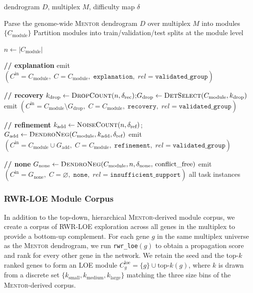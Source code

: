 \documentclass[thesis,letterpaper,12pt]{utthesis}
\begin{document}
\begin{algorithm}[t]
\caption{Creation of the \textsc{Mentor}-derived module training corpus}
\label{alg:mentor-module-corpus}
\begin{algorithmic}[1]
\Require dendrogram $D$, multiplex $M$, difficulty map $\delta$

\State Parse the genome-wide \textsc{Mentor} dendrogram $D$ over multiplex $M$ into modules $\{C_{\text{module}}\}$
\State Partition modules into train/validation/test splits at the module level

    \State $n \gets |C_{\text{module}}|$

    \State \textbf{// explanation}
    \State emit $(C^{\text{in}} = C_{\text{module}},\; C = C_{\text{module}},\; \texttt{explanation},\; rel=\texttt{validated\_group})$

    \State \textbf{// recovery}
    \State $k_{\text{drop}} \gets \textsc{DropCount}(n, \delta_{\text{rec}})$;\quad $G_{\text{drop}} \gets \textsc{DetSelect}(C_{\text{module}}, k_{\text{drop}})$
    \State emit $(C^{\text{in}} = C_{\text{module}} \setminus G_{\text{drop}},\; C = C_{\text{module}},\; \texttt{recovery},\; rel=\texttt{validated\_group})$

    \State \textbf{// refinement}
    \State $k_{\text{add}} \gets \textsc{NoiseCount}(n, \delta_{\text{ref}})$;\quad $G_{\text{add}} \gets \textsc{DendroNeg}(C_{\text{module}}, k_{\text{add}}, \delta_{\text{ref}})$
    \State emit $(C^{\text{in}} = C_{\text{module}} \cup G_{\text{add}},\; C = C_{\text{module}},\; \texttt{refinement},\; rel=\texttt{validated\_group})$

    \State \textbf{// none}
    \State $G_{\text{none}} \gets \textsc{DendroNeg}(C_{\text{module}}, n, \delta_{\text{none}},\, \text{conflict\_free})$
    \State emit $(C^{\text{in}} = G_{\text{none}},\; C = \varnothing,\; \texttt{none},\; rel=\texttt{insufficient\_support})$
\EndFor
\State \Return all task instances
\end{algorithmic}
\end{algorithm}

\subsubsection{RWR-LOE Module Corpus}
In addition to the top-down, hierarchical \textsc{Mentor}-derived module corpus, we create a corpus of RWR-LOE exploration across all genes in the multiplex to provide a bottom-up complement. For each gene $g$ in the same multiplex universe as the \textsc{Mentor} dendrogram, we run \texttt{rwr\_loe}$(g)$ to obtain a propagation score and rank for every other gene in the network. We retain the seed and the top-$k$ ranked genes to form an LOE module $C^{\text{loe}}_g = \{g\} \cup \mathrm{top\text{-}}k(g)$, where $k$ is drawn from a discrete set $\{k_{\text{small}}, k_{\text{medium}}, k_{\text{large}}\}$ matching the three size bins of the \textsc{Mentor}-derived corpus.
\end{document}
